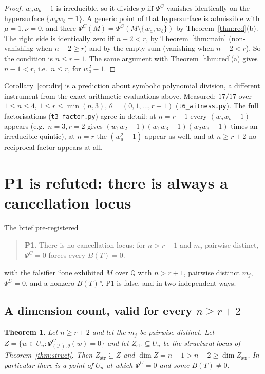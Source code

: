 \documentclass[11pt]{article}
\newtheorem{theorem}{Theorem}
\theoremstyle{definition}
\theoremstyle{remark}
\newcommand{\PsiC}{\Psi^{C}}
\newcommand{\QQ}{\mathbb{Q}}
\begin{document}
\begin{proof}
$w_aw_b-1$ is irreducible, so it divides $p$ iff $\PsiC$ vanishes identically on
the hypersurface $\{w_aw_b=1\}$. A generic point of that hypersurface is
admissible with $\mu=1,\nu=0$, and there $\PsiC(M)=\PsiC(M\setminus\{w_a,w_b\})$
by Theorem~\ref{thm:red}(b). The right side is identically zero iff $n-2<r$, by
Theorem~\ref{thm:main} (non-vanishing when $n-2\ge r$) and by the empty sum
(vanishing when $n-2<r$). So the condition is $n\le r+1$. The same argument with
Theorem~\ref{thm:red}(a) gives $n-1<r$, i.e.\ $n\le r$, for $w_a^2-1$.
\end{proof}

Corollary~\ref{cor:div} is a prediction about symbolic polynomial division, a
different instrument from the exact-arithmetic evaluations above. Measured:
$17/17$ over $1\le n\le4$, $1\le r\le\min(n,3)$, $\theta=(0,1,\dots,r-1)$
(\texttt{t6\_witness.py}). The full factorisations
(\texttt{t3\_factor.py}) agree in detail: at $n=r+1$ every $(w_aw_b-1)$ appears
(e.g.\ $n=3,r=2$ gives $(w_1w_2-1)(w_1w_3-1)(w_2w_3-1)$ times an irreducible
quintic), at $n=r$ the $(w_a^2-1)$ appear as well, and at $n\ge r+2$ no reciprocal
factor appears at all.

\section{P1 is refuted: there is always a cancellation locus}

The brief pre-registered

\begin{quote}
\textbf{P1.} There is no cancellation locus: for $n>r+1$ and $m_j$ pairwise
distinct, $\PsiC=0$ forces every $B(T)=0$.
\end{quote}

with the falsifier ``one exhibited $M$ over $\QQ$ with $n>r+1$, pairwise distinct
$m_j$, $\PsiC=0$, and a nonzero $B(T)$''. P1 is false, and in two independent ways.

\subsection{A dimension count, valid for every \texorpdfstring{$n\ge r+2$}{n >= r+2}}

\begin{theorem}\label{thm:dim}
Let $n\ge r+2$ and let the $m_j$ be pairwise distinct. Let
$Z=\{w\in U_n:\PsiC_{(1^r),\theta}(w)=0\}$ and let
$Z_{\mathrm{str}}\subseteq U_n$ be the structural locus of
Theorem~\ref{thm:struct}. Then $Z_{\mathrm{str}}\subsetneq Z$ and
$\dim Z=n-1>n-2\ge\dim Z_{\mathrm{str}}$. In particular there is a point of $U_n$
at which $\PsiC=0$ and some $B(T)\ne0$.
\end{theorem}
\end{document}
